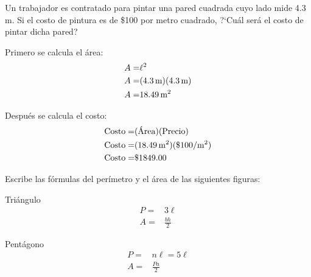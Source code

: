 \documentclass[11pt]{article}
\begin{document}
Un trabajador es contratado para pintar una pared cuadrada cuyo lado mide 4.3\,m. Si el costo de pintura es de \$100 por metro cuadrado, ?`Cu\'al ser\'a el costo de pintar dicha pared?

\vspace{5mm}

\begin{minipage}[t]{0.5\linewidth}
Primero se calcula el \'area:
\begin{align*}
A =& \ell^{2} \\
A =& (4.3\text{\,m})(4.3\text{\,m})\\
A =& 18.49\text{\,m}^{2}
\end{align*}
\end{minipage}%
\begin{minipage}[t]{0.5\linewidth}
Despu\'es se calcula el costo:
\begin{align*}
\text{Costo} =& (\text{\'Area})(\text{Precio}) \\
\text{Costo} =& (18.49\text{\,m}^{2})(\$100/\text{m}^{2})\\
\text{Costo} =& \$1849.00
\end{align*}
\end{minipage}
\vspace{5mm}

Escribe las f\'ormulas del per\'imetro y el \'area de las siguientes figuras:

\vspace{1cm}

\begin{minipage}[t]{0,5\linewidth}
\begin{center}
    Tri\'angulo
    \begin{align*}
    P =& 3\ell \\
    A =& \frac{bh}{2}
    \end{align*}
\end{center}
\end{minipage}
\begin{minipage}[t]{0,5\linewidth}
\begin{center}
    Pent\'agono
    \begin{align*}
    P =& n\ell = 5\ell \\
    A =& \frac{Pa}{2}
    \end{align*}
\end{center}
\end{minipage}
\end{document}
